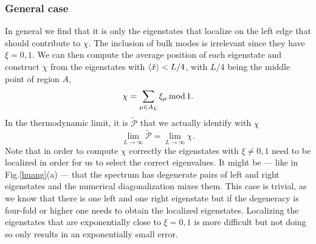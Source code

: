 \documentclass[twocolumn,amsmath,longbibliography,amssymb,superscriptaddress]{revtex4-1}
\begin{document}
\subsubsection{General case}

In general we find that it is only the eigenstates that localize on the left edge that should contribute to $\chi$. The inclusion of bulk modes is irrelevant since they have $\xi = 0,1$. We can then compute the average position of each eigenstate and construct $\chi$ from the eigenstates with $\expval{\hat{x}}<L/4$, with $L/4$ being the middle point of region $A$,
\begin{equation}
\chi = \sum_{\mu \in A_L} \xi_\mu \, {\rm mod} \, 1. 
\label{eq:chi_left}
\end{equation}
In the thermodynamic limit, it is $\tilde{\mathcal{P}}$ that we actually identify with $\chi$
\begin{equation}
\lim_{L \rightarrow \infty} \tilde{\mathcal{P}} = \lim_{L \rightarrow \infty} \chi.
\label{eq:ptilde_eq_chi}
\end{equation}
Note that in order to compute $\chi$ correctly the eigenstates with $\xi \neq 0,1$ need to be localized in order for us to select the correct eigenvalues. It might be --- like in Fig.\ref{huang}(a) --- that the spectrum has degenerate pairs of left and right eigenstates and the numerical diagonalization mixes them. This case is trivial, as we know that there is one left and one right eigenstate but if the degeneracy is four-fold or higher one needs to obtain the localized eigenstates. Localizing the eigenstates that are exponentially close to $\xi = 0,1$ is more difficult but not doing so only results in an exponentially small error. 
\end{document}
